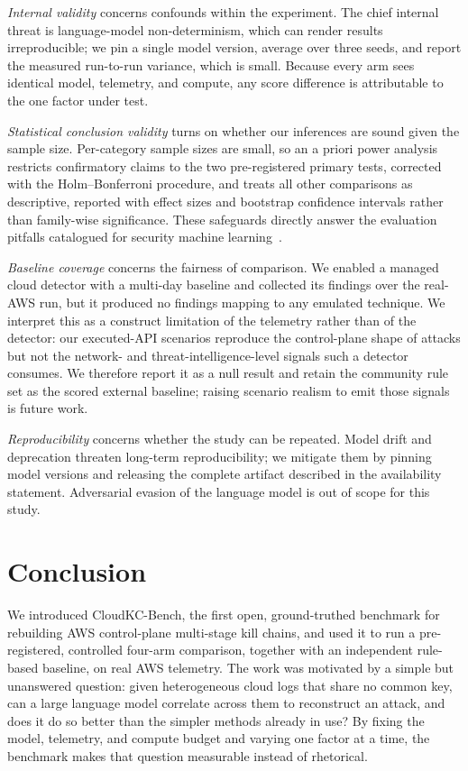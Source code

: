 \documentclass[journal]{IEEEtran}
\begin{document}
\emph{Internal validity} concerns confounds within the experiment. The chief internal threat is
language-model non-determinism, which can render results irreproducible; we pin a single model version,
average over three seeds, and report the measured run-to-run variance, which is small. Because every arm
sees identical model, telemetry, and compute, any score difference is attributable to the one factor
under test.

\emph{Statistical conclusion validity} turns on whether our inferences are sound given the sample size.
Per-category sample sizes are small, so an a priori power analysis restricts confirmatory claims to the two
pre-registered primary tests, corrected with the Holm--Bonferroni procedure, and treats all other
comparisons as descriptive, reported with effect sizes and bootstrap confidence intervals rather than
family-wise significance. These safeguards directly answer the evaluation pitfalls catalogued for
security machine learning~\cite{arp22}.

\emph{Baseline coverage} concerns the fairness of comparison. We enabled a managed cloud detector with a
multi-day baseline and collected its findings over the real-AWS run, but it produced no findings mapping
to any emulated technique. We interpret this as a construct limitation of the telemetry rather than of
the detector: our executed-API scenarios reproduce the control-plane shape of attacks but not the
network- and threat-intelligence-level signals such a detector consumes. We therefore report it as a
null result and retain the community rule set as the scored external baseline; raising scenario realism
to emit those signals is future work.

\emph{Reproducibility} concerns whether the study can be repeated. Model drift and deprecation threaten
long-term reproducibility; we mitigate them by pinning model versions and releasing the complete
artifact described in the availability statement. Adversarial evasion of the language model is out of
scope for this study.

\section{Conclusion}\label{sec:conc}
We introduced CloudKC-Bench, the first open, ground-truthed benchmark for rebuilding AWS control-plane
multi-stage kill chains, and used it to run a pre-registered, controlled four-arm comparison, together
with an independent rule-based baseline, on real AWS telemetry. The work was motivated by a simple but
unanswered question: given heterogeneous cloud logs that share no common key, can a large language model
correlate across them to reconstruct an attack, and does it do so better than the simpler methods
already in use? By fixing the model, telemetry, and compute budget and varying one factor at a time,
the benchmark makes that question measurable instead of rhetorical.
\end{document}
